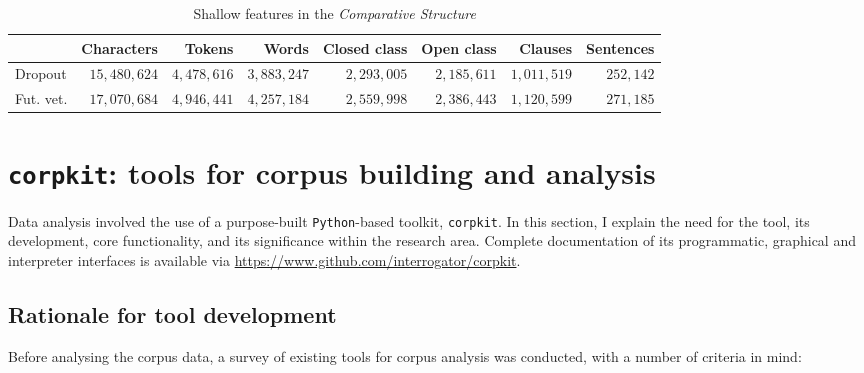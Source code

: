 \begin{table}[htb]
\centering
\footnotesize
\begin{tabular}{lrrrrrrr}

\toprule
{} &  Characters &   Tokens &    Words &  Closed class &  Open class &  Clauses &  Sentences \\
\midrule
Dropout        &    $15,480,624$ &  $4,478,616$ &  $3,883,247$ &  $2,293,005$ &           $2,185,611$ &  $1,011,519$ &     $252,142$ \\
Fut. vet. &    $17,070,684$ &  $4,946,441$ &  $4,257,184$ &  $2,559,998$ &           $2,386,443$ &  $1,120,599$ &     $271,185$ \\
\bottomrule
\end{tabular}
\caption{Shallow features in the \emph{Comparative Structure}}
\label{tab:shallow_C}
\end{table}


%


\section{\texttt{corpkit}: tools for corpus building and analysis} \label{sect:corpkit}

Data analysis involved the use of a purpose\hyp{}built \texttt{Python}\hyp{}based toolkit, \texttt{corpkit}. In this section, I explain the need for the tool, its development, core functionality, and its significance within the research area. Complete documentation of its programmatic, graphical and interpreter interfaces is available via \url{https://www.github.com/interrogator/corpkit}.

\subsection{Rationale for tool development}

Before analysing the \gls{corpus} data, a survey of existing tools for corpus analysis was conducted, with a number of criteria in mind:

